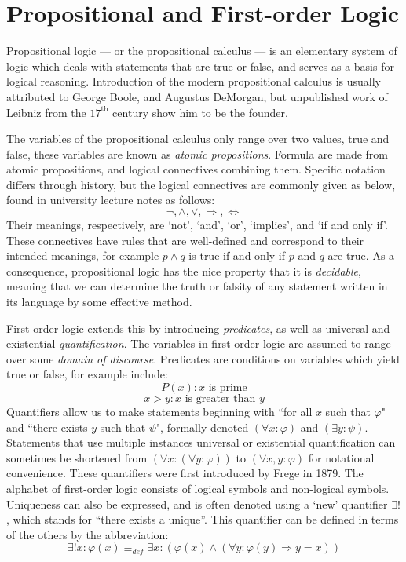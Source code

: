 \documentclass[11pt]{report}
\newcommand{\eqdef}{\equiv_\mathit{def}}
\theoremstyle{definition}
\theoremstyle{theorem}
\theoremstyle{lemma}
\begin{document}
\section{Propositional and First-order Logic}
Propositional logic --- or the propositional calculus --- is an elementary system of logic which deals with statements that are true or false, and serves as a basis for logical reasoning. 
Introduction of the modern propositional calculus is usually attributed to George Boole, and Augustus DeMorgan, but unpublished work of Leibniz from the $17^{\text{th}}$ century show him to be the founder.

The variables of the propositional calculus only range over two values, true and false, these variables are known as \emph{atomic propositions}. 
Formula are made from atomic propositions, and logical connectives combining them. Specific notation differs through history, but the logical connectives are commonly given as below, found in university lecture notes \cite[p.~2]{beckert} as follows:
$$\neg, \wedge, \vee,\Rightarrow,\Leftrightarrow$$
Their meanings, respectively, are `not', `and', `or', `implies', and `if and only if'. 
These connectives have rules that are well-defined and correspond to their intended meanings, for example $p \wedge q$ is true if and only if $p$ and $q$ are true.  
As a consequence, propositional logic has the nice property that it is \emph{decidable}, meaning that we can determine the truth or falsity of any statement written in its language by some effective method.

First-order logic extends this by introducing \emph{predicates}, as well as universal and existential \emph{quantification}. 
The variables in first-order logic are assumed to range over some \emph{domain of discourse}.
Predicates are conditions on variables which yield true or false, for example include:  
$$P(x) : x \text{ is prime}$$
$$ x > y : x \text{ is greater than } y$$
Quantifiers allow us to make statements beginning with ``for all $x$ such that $\varphi$" and ``there exists $y$ such that $\psi$", formally denoted $(\forall x:\varphi)$ and $(\exists y:\psi)$. 
Statements that use multiple instances universal or existential quantification can sometimes be shortened from $(\forall x:(\forall y: \varphi))$ to $(\forall x,y: \varphi)$ for notational convenience.
These quantifiers were first introduced by Frege \cite{frege} in 1879.
The alphabet of first-order logic consists of logical symbols and non-logical symbols.
Uniqueness can also be expressed, and is often denoted using a `new' quantifier $\exists!$, which stands for ``there exists a unique''. 
This quantifier can be defined in terms of the others by the abbreviation:
$$\exists!x:\varphi(x) \eqdef \exists x: (\varphi(x) \wedge (\forall y: \varphi(y) \Rightarrow y=x))$$
\end{document}
